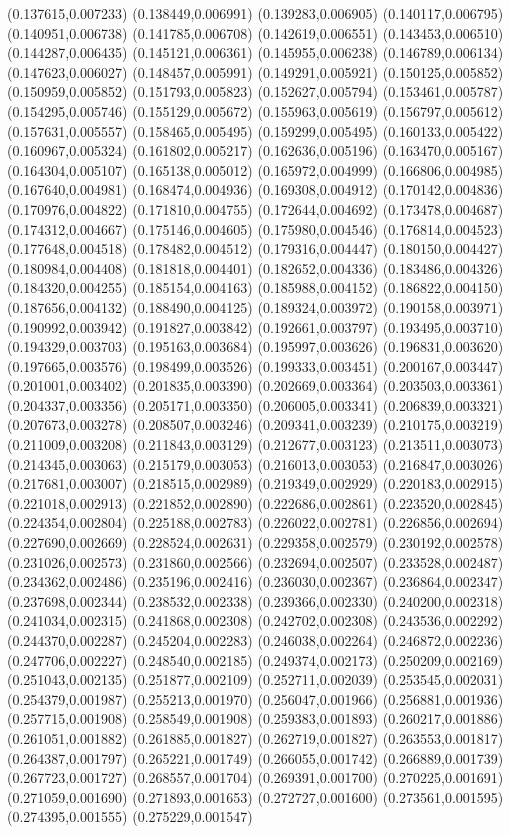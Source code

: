 {(0.137615,0.007233) (0.138449,0.006991) (0.139283,0.006905) (0.140117,0.006795) (0.140951,0.006738) (0.141785,0.006708) (0.142619,0.006551) (0.143453,0.006510) (0.144287,0.006435) (0.145121,0.006361) (0.145955,0.006238) (0.146789,0.006134) (0.147623,0.006027) (0.148457,0.005991) (0.149291,0.005921) (0.150125,0.005852) (0.150959,0.005852) (0.151793,0.005823) (0.152627,0.005794) (0.153461,0.005787) (0.154295,0.005746) (0.155129,0.005672) (0.155963,0.005619) (0.156797,0.005612) (0.157631,0.005557) (0.158465,0.005495) (0.159299,0.005495) (0.160133,0.005422) (0.160967,0.005324) (0.161802,0.005217) (0.162636,0.005196) (0.163470,0.005167) (0.164304,0.005107) (0.165138,0.005012) (0.165972,0.004999) (0.166806,0.004985) (0.167640,0.004981) (0.168474,0.004936) (0.169308,0.004912) (0.170142,0.004836) (0.170976,0.004822) (0.171810,0.004755) (0.172644,0.004692) (0.173478,0.004687) (0.174312,0.004667) (0.175146,0.004605) (0.175980,0.004546) (0.176814,0.004523) (0.177648,0.004518) (0.178482,0.004512) (0.179316,0.004447) (0.180150,0.004427) (0.180984,0.004408) (0.181818,0.004401) (0.182652,0.004336) (0.183486,0.004326) (0.184320,0.004255) (0.185154,0.004163) (0.185988,0.004152) (0.186822,0.004150) (0.187656,0.004132) (0.188490,0.004125) (0.189324,0.003972) (0.190158,0.003971) (0.190992,0.003942) (0.191827,0.003842) (0.192661,0.003797) (0.193495,0.003710) (0.194329,0.003703) (0.195163,0.003684) (0.195997,0.003626) (0.196831,0.003620) (0.197665,0.003576) (0.198499,0.003526) (0.199333,0.003451) (0.200167,0.003447) (0.201001,0.003402) (0.201835,0.003390) (0.202669,0.003364) (0.203503,0.003361) (0.204337,0.003356) (0.205171,0.003350) (0.206005,0.003341) (0.206839,0.003321) (0.207673,0.003278) (0.208507,0.003246) (0.209341,0.003239) (0.210175,0.003219) (0.211009,0.003208) (0.211843,0.003129) (0.212677,0.003123) (0.213511,0.003073) (0.214345,0.003063) (0.215179,0.003053) (0.216013,0.003053) (0.216847,0.003026) (0.217681,0.003007) (0.218515,0.002989) (0.219349,0.002929) (0.220183,0.002915) (0.221018,0.002913) (0.221852,0.002890) (0.222686,0.002861) (0.223520,0.002845) (0.224354,0.002804) (0.225188,0.002783) (0.226022,0.002781) (0.226856,0.002694) (0.227690,0.002669) (0.228524,0.002631) (0.229358,0.002579) (0.230192,0.002578) (0.231026,0.002573) (0.231860,0.002566) (0.232694,0.002507) (0.233528,0.002487) (0.234362,0.002486) (0.235196,0.002416) (0.236030,0.002367) (0.236864,0.002347) (0.237698,0.002344) (0.238532,0.002338) (0.239366,0.002330) (0.240200,0.002318) (0.241034,0.002315) (0.241868,0.002308) (0.242702,0.002308) (0.243536,0.002292) (0.244370,0.002287) (0.245204,0.002283) (0.246038,0.002264) (0.246872,0.002236) (0.247706,0.002227) (0.248540,0.002185) (0.249374,0.002173) (0.250209,0.002169) (0.251043,0.002135) (0.251877,0.002109) (0.252711,0.002039) (0.253545,0.002031) (0.254379,0.001987) (0.255213,0.001970) (0.256047,0.001966) (0.256881,0.001936) (0.257715,0.001908) (0.258549,0.001908) (0.259383,0.001893) (0.260217,0.001886) (0.261051,0.001882) (0.261885,0.001827) (0.262719,0.001827) (0.263553,0.001817) (0.264387,0.001797) (0.265221,0.001749) (0.266055,0.001742) (0.266889,0.001739) (0.267723,0.001727) (0.268557,0.001704) (0.269391,0.001700) (0.270225,0.001691) (0.271059,0.001690) (0.271893,0.001653) (0.272727,0.001600) (0.273561,0.001595) (0.274395,0.001555) (0.275229,0.001547) }

